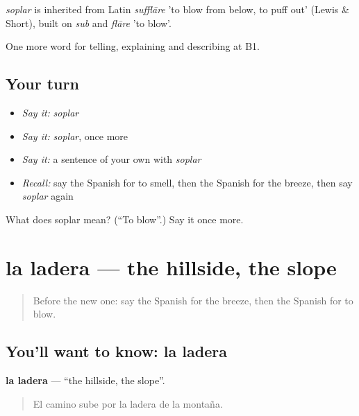 \begin{cousinweb}
\emph{soplar} is inherited from Latin \emph{sufflāre} 'to blow from below, to puff out' (Lewis \& Short), built on \emph{sub} and \emph{flāre} 'to blow'.
\end{cousinweb}

\begin{grammarlens}[title={What you've built}]
One more word for telling, explaining and describing at B1.
\end{grammarlens}

\subsection*{Your turn}
\begin{itemize}
\raggedright
  \item \emph{Say it:} \emph{soplar}
  \item \emph{Say it:} \emph{soplar}, once more
  \item \emph{Say it:} a sentence of your own with \emph{soplar}
  \item \emph{Recall:} say the Spanish for to smell, then the Spanish for the breeze, then say \emph{soplar} again
\end{itemize}

\begin{tcolorbox}[breakable,colback=teal!4,colframe=teal!35!black,title={Before you move on}]
What does soplar mean? (\textquotedblleft{}To blow\textquotedblright{}.) Say it once more.
\end{tcolorbox}
\section[la ladera]{la ladera — the hillside, the slope}

\label{lesson:ES-C772-ladera}



\begin{quote}
Before the new one: say the Spanish for the breeze, then the Spanish for to blow.
\end{quote}

\subsection*{You'll want to know: la ladera}
\textbf{la ladera} — \textquotedblleft{}the hillside, the slope\textquotedblright{}.

\begin{quote}
El camino sube por la ladera de la montaña.
\end{quote}

